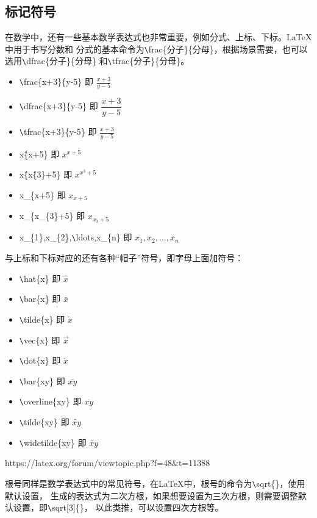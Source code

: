 \subsection{标记符号}
在数学中，还有一些基本数学表达式也非常重要，例如分式、上标、下标。LaTeX中用于书写分数和
分式的基本命令为\verb|\|frac\{分子\}\{分母\}，根据场景需要，也可以选用\verb|\|dfrac\{分子\}\{分母\}
和\verb|\|tfrac\{分子\}\{分母\}。

\begin{itemize}
    \item \verb|\|frac\{x+3\}\{y-5\} 即 $\frac{x+3}{y-5}$
    \item \verb|\|dfrac\{x+3\}\{y-5\} 即 $\dfrac{x+3}{y-5}$
    \item \verb|\|tfrac\{x+3\}\{y-5\} 即 $\tfrac{x+3}{y-5}$
    \item x\^\{x+5\} 即 $x^{x+5}$
    \item x\^\{x\^\{3\}+5\} 即 $x^{x^{3}+5}$
    \item x\_\{x+5\} 即 $x_{x+5}$
    \item x\_\{x\_\{3\}+5\} 即 $x_{x_{3}+5}$
    \item x\_\{1\},x\_\{2\},\verb|\|ldots,x\_\{n\} 即 $x_{1},x_{2},\ldots,x_{n}$
\end{itemize}

与上标和下标对应的还有各种“帽子”符号，即字母上面加符号：
\begin{itemize}
    \item \verb|\|hat\{x\} 即 $\hat{x}$
    \item \verb|\|bar\{x\} 即 $\bar{x}$
    \item \verb|\|tilde\{x\} 即 $\tilde{x}$
    \item \verb|\|vec\{x\} 即 $\vec{x}$
    \item \verb|\|dot\{x\} 即 $\dot{x}$
    \item \verb|\|bar\{xy\} 即 $\bar{xy}$
    \item \verb|\|overline\{xy\} 即 $\overline{xy}$
    \item \verb|\|tilde\{xy\} 即 $\tilde{xy}$
    \item \verb|\|widetilde\{xy\} 即 $\widetilde{xy}$
\end{itemize}

\begin{tcolorbox}[colback=red!5!white, colframe=red!50!black,
        title=Tilde over the letter]
    https://latex.org/forum/viewtopic.php?f=48\&t=11388
\end{tcolorbox}

根号同样是数学表达式中的常见符号，在LaTeX中，根号的命令为\verb|\|sqrt\{\}，使用默认设置，
生成的表达式为二次方根，如果想要设置为三次方根，则需要调整默认设置，即\verb|\|sqrt[3]\{\}，
以此类推，可以设置四次方根等。

